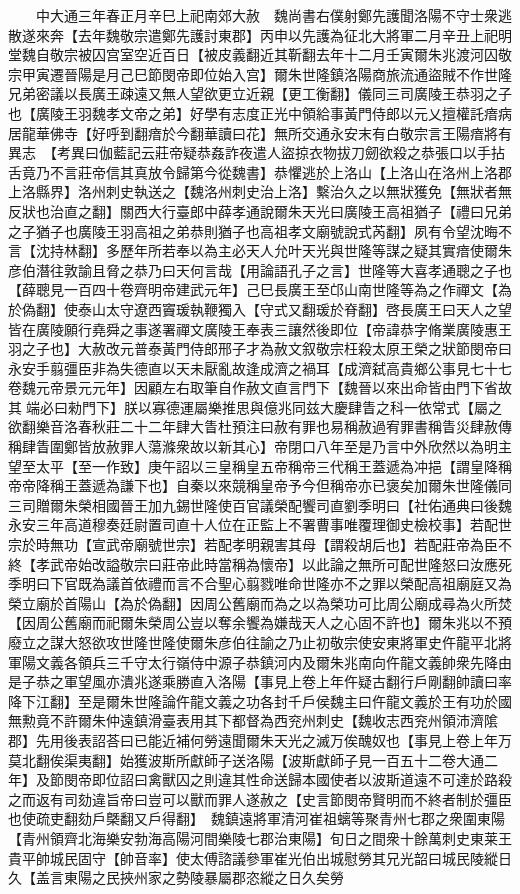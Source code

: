 　　中大通三年春正月辛巳上祀南郊大赦　魏尚書右僕射鄭先護聞洛陽不守士衆逃散遂來奔【去年魏敬宗遣鄭先護討東郡】丙申以先護為征北大將軍二月辛丑上祀明堂魏自敬宗被囚宫室空近百日【被皮義翻近其靳翻去年十二月壬寅爾朱兆渡河囚敬宗甲寅遷晉陽是月己巳節閔帝即位始入宫】爾朱世隆鎮洛陽商旅流通盜賊不作世隆兄弟密議以長廣王疎遠又無人望欲更立近親【更工衡翻】儀同三司廣陵王恭羽之子也【廣陵王羽魏孝文帝之弟】好學有志度正光中領給事黃門侍郎以元乂擅權託瘖病居龍華佛寺【好呼到翻瘖於今翻華讀曰花】無所交通永安末有白敬宗言王陽瘖將有異志　【考異曰伽藍記云莊帝疑恭姦詐夜遣人盜掠衣物拔刀劒欲殺之恭張口以手拈舌竟乃不言莊帝信其真放令歸第今從魏書】恭懼逃於上洛山【上洛山在洛州上洛郡上洛縣界】洛州刺史執送之【魏洛州刺史治上洛】繫治久之以無狀獲免【無狀者無反狀也治直之翻】關西大行臺郎中薛孝通說爾朱天光曰廣陵王高祖猶子【禮曰兄弟之子猶子也廣陵王羽高祖之弟恭則猶子也高祖孝文廟號說式芮翻】夙有令望沈晦不言【沈持林翻】多歷年所若奉以為主必天人允叶天光與世隆等謀之疑其實瘖使爾朱彦伯潛往敦諭且脅之恭乃曰天何言哉【用論語孔子之言】世隆等大喜孝通聰之子也【薛聰見一百四十卷齊明帝建武元年】己巳長廣王至邙山南世隆等為之作禪文【為於偽翻】使泰山太守遼西竇瑗執鞭獨入【守式又翻瑗於脊翻】啓長廣王曰天人之望皆在廣陵願行堯舜之事遂署禪文廣陵王奉表三讓然後即位【帝諱恭字脩業廣陵惠王羽之子也】大赦改元普泰黃門侍郎邢子才為赦文叙敬宗枉殺太原王榮之狀節閔帝曰永安手翦彊臣非為失德直以天未厭亂故逢成濟之禍耳【成濟弑高貴鄉公事見七十七卷魏元帝景元元年】因顧左右取筆自作赦文直言門下【魏晉以來出命皆由門下省故其端必曰勑門下】朕以寡德運屬樂推思與億兆同兹大慶肆眚之科一依常式【屬之欲翻樂音洛春秋莊二十二年肆大眚杜預注曰赦有罪也易稱赦過宥罪書稱眚災肆赦傳稱肆眚圍鄭皆放赦罪人蕩滌衆故以新其心】帝閉口八年至是乃言中外欣然以為明主望至太平【至一作致】庚午詔以三皇稱皇五帝稱帝三代稱王蓋遞為冲挹【謂皇降稱帝帝降稱王蓋遞為謙下也】自秦以來競稱皇帝予今但稱帝亦已褒矣加爾朱世隆儀同三司贈爾朱榮相國晉王加九錫世隆使百官議榮配饗司直劉季明曰【社佑通典曰後魏永安三年高道穆奏廷尉置司直十人位在正監上不署曹事唯覆理御史檢校事】若配世宗於時無功【宣武帝廟號世宗】若配孝明親害其母【謂殺胡后也】若配莊帝為臣不終【孝武帝始改謚敬宗曰莊帝此時當稱為懷帝】以此論之無所可配世隆怒曰汝應死季明曰下官既為議首依禮而言不合聖心翦戮唯命世隆亦不之罪以榮配高祖廟庭又為榮立廟於首陽山【為於偽翻】因周公舊廟而為之以為榮功可比周公廟成尋為火所焚【因周公舊廟而祀爾朱榮周公豈以奪余饗為嫌哉天人之心固不許也】爾朱兆以不預廢立之謀大怒欲攻世隆世隆使爾朱彦伯往諭之乃止初敬宗使安東將軍史仵龍平北將軍陽文義各領兵三千守太行嶺侍中源子恭鎮河内及爾朱兆南向仵龍文義帥衆先降由是子恭之軍望風亦潰兆遂乘勝直入洛陽【事見上卷上年仵疑古翻行戶剛翻帥讀曰率降下江翻】至是爾朱世隆論仵龍文義之功各封千戶侯魏主曰仵龍文義於王有功於國無勲竟不許爾朱仲遠鎮滑臺表用其下都督為西兖州刺史【魏收志西兖州領沛濟隂郡】先用後表詔荅曰已能近補何勞遠聞爾朱天光之滅万俟醜奴也【事見上卷上年万莫北翻俟渠夷翻】始獲波斯所獻師子送洛陽【波斯獻師子見一百五十二卷大通二年】及節閔帝即位詔曰禽獸囚之則違其性命送歸本國使者以波斯道遠不可達於路殺之而返有司劾違旨帝曰豈可以獸而罪人遂赦之【史言節閔帝賢明而不終者制於彊臣也使疏吏翻劾戶槩翻又戶得翻】　魏鎮遠將軍清河崔祖螭等聚青州七郡之衆圍東陽【青州領齊北海樂安勃海高陽河間樂陵七郡治東陽】旬日之間衆十餘萬刺史東莱王貴平帥城民固守【帥音率】使太傅諮議參軍崔光伯出城慰勞其兄光韶曰城民陵縱日久【盖言東陽之民挾州家之勢陵暴屬郡恣縱之日久矣勞